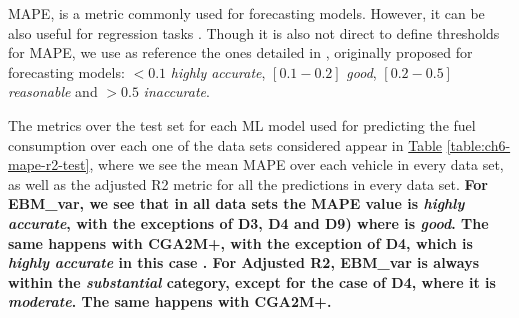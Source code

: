 MAPE, is a metric commonly used for forecasting models. However, it can be also useful for regression tasks \parencite{de2016mean}. Though it is also not direct to define thresholds for MAPE, we use as reference the ones detailed in \parencite{lewis1982industrial}, originally proposed for forecasting models: $<0.1$ \textit{highly accurate}, $[0.1-0.2]$ \textit{good}, $[0.2-0.5]$ \textit{reasonable} and $>0.5$ \textit{inaccurate}.

The metrics over the test set for each ML model used for predicting the fuel consumption over each one of the data sets considered appear in \hyperref[table:ch6-mape-r2-test]{Table} \ref{table:ch6-mape-r2-test}, where we see the mean MAPE over each vehicle in every data set, as well as the adjusted R2 metric for all the predictions in every data set. \textbf{For EBM\_var, we  see that in all data sets the MAPE value is \textit{highly accurate}, with the exceptions of D3, D4 and D9) where is \textit{good}. The same happens with CGA2M+, with the exception of D4, which is \textit{highly accurate} in this case . For Adjusted R2, EBM\_var is always within the \textit{substantial} category, except for the case of D4, where it is \textit{moderate}. The same happens with CGA2M+.}

